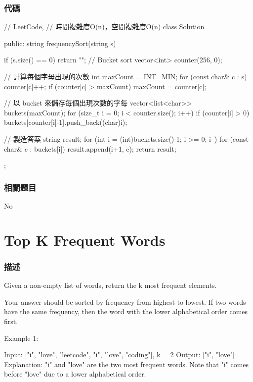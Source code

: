 \subsubsection{代碼}
\begin{Code}
// LeetCode,
// 時間複雜度O(n)，空間複雜度O(n)
class Solution {
public:
    string frequencySort(string s) {
        if (s.size() == 0) return "";
        // Bucket sort
        vector<int> counter(256, 0);

        // 計算每個字母出現的次數
        int maxCount = INT_MIN;
        for (const char& c : s)
        {
            counter[c]++;
            if (counter[c] > maxCount)
                maxCount = counter[c];
        }

        // 以 bucket 來儲存每個出現次數的字每
        vector<list<char>> buckets(maxCount);
        for (size_t i = 0; i < counter.size(); i++)
        {
            if (counter[i] > 0)
                buckets[counter[i]-1].push_back((char)i);
        }

        // 製造答案
        string result;
        for (int i = (int)buckets.size()-1; i >= 0; i--)
        {
            for (const char& c : buckets[i])
                result.append(i+1, c);
        }
        return result;
    }
};
\end{Code}

\subsubsection{相關題目}
No

\section{Top K Frequent Words} %
\label{sec:top-k-frequent-words}


\subsubsection{描述}
Given a non-empty list of words, return the k most frequent elements.

Your answer should be sorted by frequency from highest to lowest. If two words have the same frequency, then the word with the lower alphabetical order comes first.

Example 1:
\begin{Code}
Input: ["i", "love", "leetcode", "i", "love", "coding"], k = 2
Output: ["i", "love"]
Explanation: "i" and "love" are the two most frequent words.
    Note that "i" comes before "love" due to a lower alphabetical order.
\end{Code}

